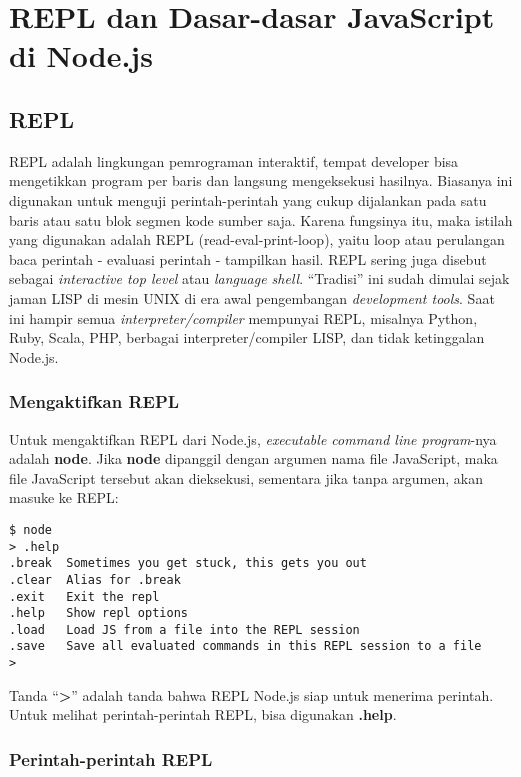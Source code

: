 \chapter{REPL dan Dasar-dasar JavaScript di Node.js}

\section{REPL}

REPL adalah lingkungan pemrograman interaktif, tempat developer bisa mengetikkan program per baris dan langsung mengeksekusi hasilnya. Biasanya ini digunakan untuk menguji perintah-perintah yang cukup dijalankan pada satu baris atau satu blok segmen kode sumber saja. Karena fungsinya itu, maka istilah yang digunakan adalah REPL (read-eval-print-loop), yaitu loop atau perulangan baca perintah - evaluasi perintah - tampilkan hasil. REPL sering juga disebut sebagai \textit{interactive top level} atau \textit{language shell}. ``Tradisi'' ini sudah dimulai sejak jaman LISP di mesin UNIX di era awal pengembangan \textit{development tools}. Saat ini hampir semua \textit{interpreter/compiler} mempunyai REPL, misalnya Python, Ruby, Scala, PHP, berbagai interpreter/compiler LISP, dan tidak ketinggalan Node.js. 

\subsection{Mengaktifkan REPL}

Untuk mengaktifkan REPL dari Node.js, \textit{executable command line program}-nya adalah \textbf{node}. Jika \textbf{node} dipanggil dengan argumen nama file JavaScript, maka file JavaScript tersebut akan dieksekusi, sementara jika tanpa argumen, akan masuke ke REPL:

\lstset{language=bash,caption=Node.js REPL}
\begin{lstlisting}
$ node
> .help
.break	Sometimes you get stuck, this gets you out
.clear	Alias for .break
.exit	Exit the repl
.help	Show repl options
.load	Load JS from a file into the REPL session
.save	Save all evaluated commands in this REPL session to a file
>
\end{lstlisting}

Tanda ``\textbf{>}'' adalah tanda bahwa REPL Node.js siap untuk menerima perintah. Untuk melihat perintah-perintah REPL, bisa digunakan \textbf{.help}.

\subsection{Perintah-perintah REPL}

